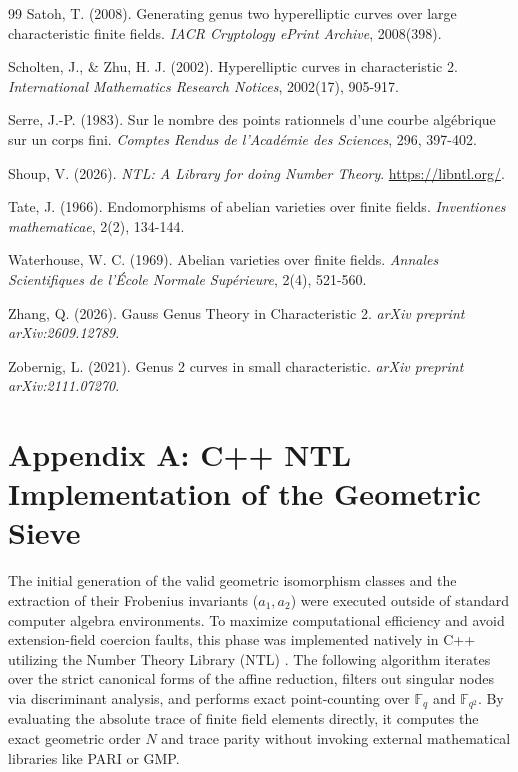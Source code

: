 \documentclass[letterpaper, 11pt]{article}
\begin{document}
\begin{thebibliography}{99}
Satoh, T. (2008). Generating genus two hyperelliptic curves over large characteristic finite fields. \textit{IACR Cryptology ePrint Archive}, 2008(398).

Scholten, J., \& Zhu, H. J. (2002). Hyperelliptic curves in characteristic 2. \textit{International Mathematics Research Notices}, 2002(17), 905-917.

Serre, J.-P. (1983). Sur le nombre des points rationnels d'une courbe algébrique sur un corps fini. \textit{Comptes Rendus de l'Académie des Sciences}, 296, 397-402.

Shoup, V. (2026). \textit{NTL: A Library for doing Number Theory}. \url{https://libntl.org/}.

Tate, J. (1966). Endomorphisms of abelian varieties over finite fields. \textit{Inventiones mathematicae}, 2(2), 134-144.

Waterhouse, W. C. (1969). Abelian varieties over finite fields. \textit{Annales Scientifiques de l'\'{E}cole Normale Sup\'{e}rieure}, 2(4), 521-560.

Zhang, Q. (2026). Gauss Genus Theory in Characteristic 2. \textit{arXiv preprint arXiv:2609.12789}.

Zobernig, L. (2021). Genus 2 curves in small characteristic. \textit{arXiv preprint arXiv:2111.07270}.

\end{thebibliography}

\appendix
\section{Appendix A: C++ NTL Implementation of the Geometric Sieve}
The initial generation of the valid geometric isomorphism classes and the extraction of their Frobenius invariants ($a_1, a_2$) were executed outside of standard computer algebra environments. To maximize computational efficiency and avoid extension-field coercion faults, this phase was implemented natively in C++ utilizing the Number Theory Library (NTL) \cite{ShoupNTL}. The following algorithm iterates over the strict canonical forms of the affine reduction, filters out singular nodes via discriminant analysis, and performs exact point-counting over $\mathbb{F}_q$ and $\mathbb{F}_{q^2}$. By evaluating the absolute trace of finite field elements directly, it computes the exact geometric order $N$ and trace parity without invoking external mathematical libraries like PARI or GMP.
\end{document}
